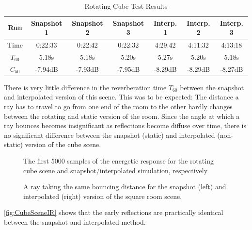 \begin{table}[t!]
    \centering
    \begin{tabular}{| c | c | c | c | c | c | c |}
        \hline
        Run        & Snapshot 1 & Snapshot 2 & Snapshot 3 & Interp. 1 & Interp. 2 & Interp. 3 \\
        \hline
        Time       & 0:22:33    & 0:22:42    & 0:22:32    & 4:29:42   & 4:11:32   & 4:13:18   \\
        \hline
        \(T_{60}\) & 5.18s      & 5.18s      & 5.20s      & 5.27s     & 5.20s     & 5.18s     \\
        \hline
        \(C_{50}\) & -7.94dB    & -7.93dB    & -7.95dB    & -8.29dB   & -8.29dB   & -8.27dB   \\
        \hline
    \end{tabular}
    \caption{Rotating Cube Test Results}\label{tbl:CubeSceneTable}
\end{table}
There is very little difference in the reverberation time \(T_{60}\) between the snapshot and interpolated version of this scene.
This was to be expected:
The distance a ray has to travel to go from one end of the room to the other hardly changes between the rotating and static version of the room.
Since the angle at which a ray bounces becomes insignificant as reflections become diffuse over time,
there is no significant difference between the snapshot (static) and interpolated (non-static) version of the cube scene.
\newline
\begin{figure}[t!]
    \begin{center}
        
    \end{center}
    \caption[The start of the energetic responses for test scene 2]{The first 5000 samples of the energetic response for the rotating cube scene and snapshot/interpolated simulation, respectively}\label{fig:CubeSceneIR}
\end{figure}
\begin{figure}[t!]
    \begin{center}
        
    \end{center}
    \caption[Demonstration of matching bounces between static and rotating scene.]{A ray taking the same bouncing distance for the snapshot (left) and interpolated (right) version of the square room scene.}\label{fig:CubeRotation}
\end{figure}
\autoref{fig:CubeSceneIR} shows that the early reflections are practically identical between the snapshot and interpolated method.
